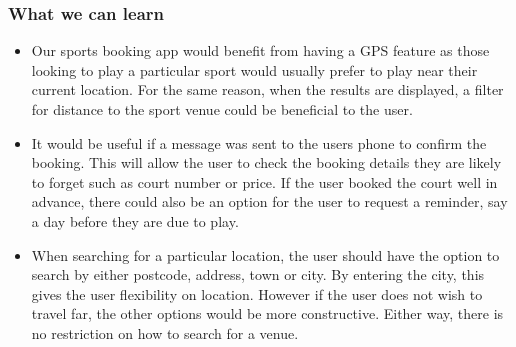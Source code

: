 \subsubsection{What we can learn}
\label{ssub:what_we_can_learn2}

\begin{itemize}
	\item Our sports booking app would benefit from having a GPS feature as
		those looking to play a particular sport would usually prefer to play
		near their current location. For the same reason, when the results are
		displayed, a filter for distance to the sport venue could be beneficial
		to the user.
	\item It would be useful if a message was sent to the users phone to
		confirm the booking. This will allow the user to check the booking
		details they are likely to forget such as court number or price. If the
		user booked the court well in advance, there could also be an option
		for the user to request  a reminder,  say a day before they are due to
		play.
	\item When searching for a particular location, the user should have the
		option to search by either postcode, address, town or city. By entering
		the city, this gives the user flexibility on location. However if the
		user does not wish to travel far, the other options would be more
		constructive. Either way, there is no restriction on how to search for
		a venue.
\end{itemize}
